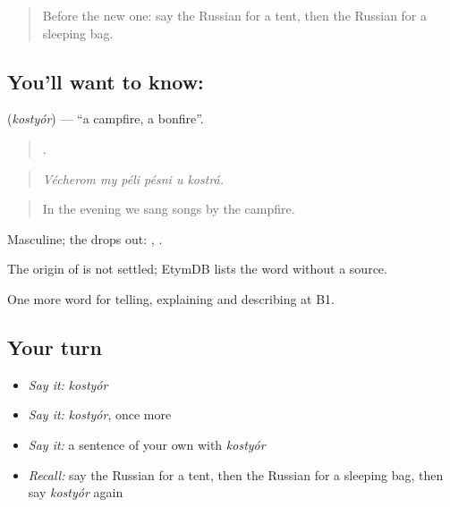 \label{lesson:RU-C462-kostyor}



\begin{quote}
Before the new one: say the Russian for a tent, then the Russian for a sleeping bag.
\end{quote}

\subsection*{You'll want to know: }
\textbf{} (\emph{kostyór}) — \textquotedblleft{}a campfire, a bonfire\textquotedblright{}.

\begin{quote}
     .
\end{quote}

\begin{quote}
\emph{Vécherom my péli pésni u kostrá.}
\end{quote}

\begin{quote}
In the evening we sang songs by the campfire.
\end{quote}

Masculine; the  drops out: \emph{}, \emph{}.

\begin{cousinweb}
The origin of \emph{} is not settled; EtymDB lists the word without a source.
\end{cousinweb}

\begin{grammarlens}[title={What you've built}]
One more word for telling, explaining and describing at B1.
\end{grammarlens}

\subsection*{Your turn}
\begin{itemize}
\raggedright
  \item \emph{Say it:} \emph{kostyór}
  \item \emph{Say it:} \emph{kostyór}, once more
  \item \emph{Say it:} a sentence of your own with \emph{kostyór}
  \item \emph{Recall:} say the Russian for a tent, then the Russian for a sleeping bag, then say \emph{kostyór} again
\end{itemize}

